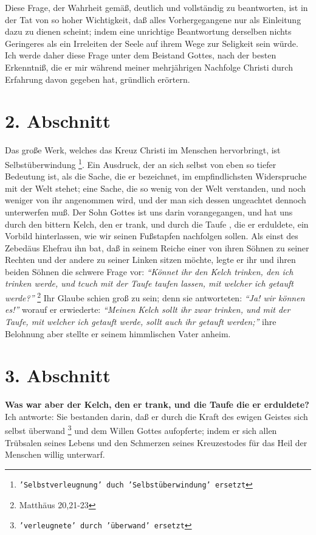 Diese Frage, der Wahrheit gemäß, deutlich und vollständig zu beantworten, ist in
der Tat von so hoher Wichtigkeit, daß alles Vorhergegangene nur als Einleitung
dazu zu dienen scheint; indem eine unrichtige Beantwortung derselben nichts
Geringeres als ein Irreleiten der Seele auf ihrem Wege zur Seligkeit sein würde.
Ich werde daher diese Frage unter dem Beistand Gottes, nach der besten
Erkenntniß, die er mir während meiner mehrjährigen Nachfolge Christi durch
Erfahrung davon gegeben hat, gründlich erörtern.

\section{2. Abschnitt} \label{kap4_ab2}

Das große Werk, welches das Kreuz Christi im Menschen hervorbringt, ist
Selbstüberwindung \footnote{\texttt{'Selbstverleugnung' duch 'Selbstüberwindung'
ersetzt}}. Ein Ausdruck, der an sich selbst von eben so tiefer Bedeutung
ist, als die Sache, die er bezeichnet, im empfindlichsten Widerspruche mit der
Welt stehet; eine Sache, die so wenig von der Welt verstanden, und noch weniger
von ihr angenommen wird, und der man sich dessen ungeachtet dennoch unterwerfen
muß. Der Sohn Gottes ist uns darin vorangegangen, und hat uns durch den bittern
Kelch, den er trank, und durch die Taufe , die er erduldete, ein
Vorbild
hinterlassen, wie wir seinen Fußstapfen nachfolgen sollen. Als einst des
Zebedäus Ehefrau  ihn bat, daß in seinem
Reiche einer von ihren Söhnen zu
seiner Rechten und der andere zu seiner Linken sitzen möchte, legte er ihr und
ihren beiden Söhnen die schwere Frage vor:
\textit{"`Könnet ihr den Kelch trinken, den
ich trinken werde, und tcuch mit der Taufe taufen lassen, mit welcher ich
getauft werde?"'}
\footnote{Matthäus  20,21-23}
Ihr Glaube schien groß zu sein; denn
sie antworteten:\textit{ "`Ja! wir können es!"'} worauf er erwiederte:
  \textit{"`Meinen Kelch
sollt ihr zwar trinken, und mit der Taufe, mit welcher ich getauft werde, sollt
auch ihr getauft werden;"'} ihre Belohnung aber stellte er seinem himmlischen
Vater anheim.

\section{3. Abschnitt} \label{kap4_ab3}

 
\textbf{Was war aber der Kelch, den er trank, und die Taufe die er erduldete?}
Ich
antworte: Sie bestanden darin, daß er durch die Kraft des ewigen Geistes sich
selbst überwand \footnote{\texttt{'verleugnete' durch 'überwand' ersetzt}} und dem
Willen Gottes aufopferte; indem er sich allen
Trübsalen seines Lebens und den Schmerzen seines Kreuzestodes für das Heil der
Menschen willig unterwarf.

